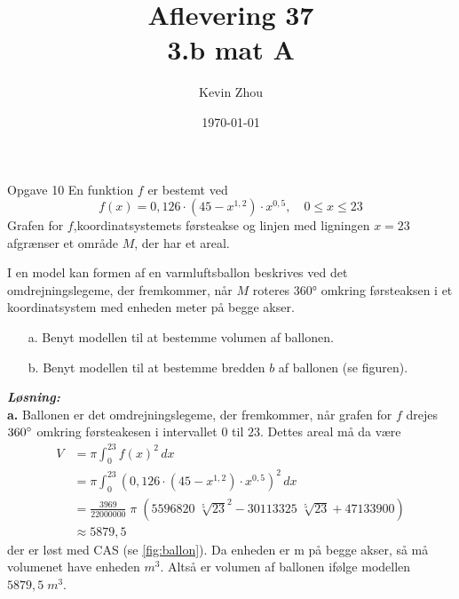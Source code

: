 \documentclass{article}
\title{Aflevering 37\\
{\Large \textbf{3.b mat A}}}
\author{Kevin Zhou}
\date{\today}
\newcommand{\sol}{\setlength{\parindent}{0cm}\textbf{\textit{Løsning:}}\setlength{\parindent}{1cm}}
\begin{document}
\maketitle
\newpage
\begin{question}{Opgave 10}{}
 En funktion $f$ er bestemt ved 
  \[
  f(x)=0,126 \cdot \left(45-x^{1,2}\right) \cdot x ^{0,5}, \quad 0 \leq x \leq 23
  \] 
Grafen for $f$,koordinatsystemets førsteakse og linjen med ligningen $x=23$ afgrænser et område $M$, der har et areal.

I en model kan formen af en varmluftsballon beskrives ved det omdrejningslegeme, der fremkommer, når $M$ roteres 360° omkring førsteaksen i et koordinatsystem med enheden meter på begge akser.
\begin{itemize}
  \item[a.] Benyt modellen til at bestemme volumen af ballonen.
  \item[b.] Benyt modellen til at bestemme bredden $b$ af ballonen (se figuren).
\end{itemize}
\end{question}
\sol \\
\textbf{a.}
Ballonen er det omdrejningslegeme, der fremkommer, når grafen for $f$ drejes $360 \degree $ omkring førsteakesen i intervallet $0$ til $23$.
Dettes areal må da være 
\begin{equation*}
\begin{split}
  V&=\pi \int_{0}^{23} f(x)^2 \,dx \\
  &=\pi \int_{0}^{23} \left(0,126 \cdot \left(45-x^{1,2}\right) \cdot x ^{0,5}\right)^2 \,dx \\
  &=\frac{3969}{22000000} \; \pi  \; \left(5596820 \; \sqrt[5]{23}^{2} - 30113325 \; \sqrt[5]{23} + 47133900 \right)\\
  &\approx 5879,5 
\end{split}
\end{equation*}
der er løst med CAS (se \cref{fig:ballon}).
Da enheden er m på begge akser, så må volumenet have enheden $\unit{m^3} $.
Altså er volumen af ballonen ifølge modellen $5879,5 \;\unit{m^3} $.
\end{document}
